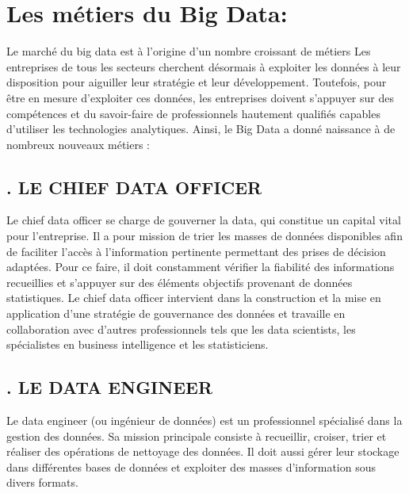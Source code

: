 \section{Les métiers du Big Data:}
Le marché du big data est à l'origine d'un nombre croissant de métiers Les entreprises de tous les secteurs cherchent désormais à exploiter les données à leur disposition pour aiguiller leur stratégie et leur développement. Toutefois, pour être en mesure d'exploiter ces données, les entreprises doivent s'appuyer sur des compétences et du savoir-faire de professionnels hautement qualifiés capables d'utiliser les technologies analytiques. Ainsi, le Big Data a donné naissance à de nombreux nouveaux métiers : 

\subsection*{. LE CHIEF DATA OFFICER}
Le chief data officer se charge de gouverner la data, qui constitue un capital vital pour l'entreprise. Il a pour mission de trier les masses de données disponibles afin de faciliter l'accès à l'information pertinente permettant des prises de décision adaptées. Pour ce faire, il doit constamment vérifier la fiabilité des informations recueillies et s'appuyer sur des éléments objectifs provenant de données statistiques. Le chief data officer intervient dans la construction et la mise en application d'une stratégie de gouvernance des données et travaille en collaboration avec d'autres professionnels tels que les data scientists, les spécialistes en business intelligence et les statisticiens.

\subsection*{. LE DATA ENGINEER}
Le data engineer (ou ingénieur de données) est un professionnel spécialisé dans la gestion des données. Sa mission principale consiste à recueillir, croiser, trier et réaliser des opérations de nettoyage des données. Il doit aussi gérer leur stockage dans différentes bases de données et exploiter des masses d'information sous divers formats.

